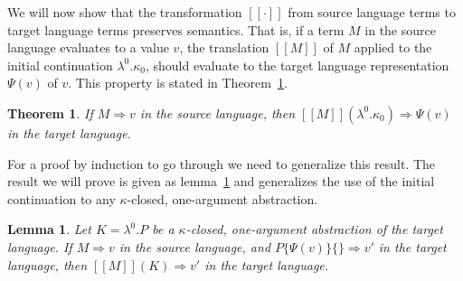 \documentclass[a4paper,11pt,draft]{article}
\newtheorem{lemma}{\sffamily Lemma}
\newtheorem{theorem}{\sffamily Theorem}
\begin{document}
We will now show that the transformation $[\![\cdot]\!]$ from source language
terms to target language terms preserves semantics. That is, if a term $M$ in
the source language evaluates to a value $v$, the translation $[\![M]\!]$ of $M$
applied to the initial continuation $\lambda^{0}.\kappa_{0}$, should evaluate to
the target language representation $\Psi(v)$ of $v$. This property is stated in
Theorem~\ref{thm:maintheorem}.

\begin{theorem}\label{thm:maintheorem}
If $M \Rightarrow v$ in the source language, then
$[\![M]\!] (\lambda^{0}.\kappa_{0}) \Rightarrow \Psi(v)$ in the target language.
\end{theorem}

For a proof by induction to go through we need to generalize this result. The
result we will prove is given as lemma~\ref{lem:mainlemma} and generalizes the
use of the initial continuation to any $\kappa$-closed, one-argument
abstraction.

\begin{lemma}\label{lem:mainlemma}
  Let $K = \lambda^{0}.P$ be a $\kappa$-closed, one-argument
  abstraction of the target language. If $M \Rightarrow v$ in the
  source language, and $P\{\Psi(v)\}\{\} \Rightarrow v'$ in the target
  language, then $[\![M]\!](K) \Rightarrow v'$ in the target language.
\end{lemma}
\end{document}

